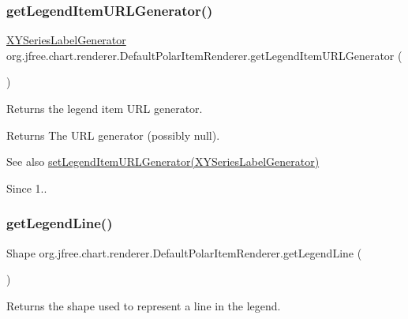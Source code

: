 \subsubsection{\texorpdfstring{get\+Legend\+Item\+U\+R\+L\+Generator()}{getLegendItemURLGenerator()}}
{\footnotesize\ttfamily \mbox{\hyperlink{interfaceorg_1_1jfree_1_1chart_1_1labels_1_1_x_y_series_label_generator}{X\+Y\+Series\+Label\+Generator}} org.\+jfree.\+chart.\+renderer.\+Default\+Polar\+Item\+Renderer.\+get\+Legend\+Item\+U\+R\+L\+Generator (\begin{DoxyParamCaption}{ }\end{DoxyParamCaption})}

Returns the legend item U\+RL generator.

\begin{DoxyReturn}{Returns}
The U\+RL generator (possibly {\ttfamily null}).
\end{DoxyReturn}
\begin{DoxySeeAlso}{See also}
\mbox{\hyperlink{classorg_1_1jfree_1_1chart_1_1renderer_1_1_default_polar_item_renderer_a38cde3541e3a1b237ffad39b0464e335}{set\+Legend\+Item\+U\+R\+L\+Generator(\+X\+Y\+Series\+Label\+Generator)}} 
\end{DoxySeeAlso}
\begin{DoxySince}{Since}
1.. 
\end{DoxySince}
\mbox{\label{classorg_1_1jfree_1_1chart_1_1renderer_1_1_default_polar_item_renderer_a5b323bb3c4df0c784bbffa591b3d8d99}} 
\subsubsection{\texorpdfstring{get\+Legend\+Line()}{getLegendLine()}}
{\footnotesize\ttfamily Shape org.\+jfree.\+chart.\+renderer.\+Default\+Polar\+Item\+Renderer.\+get\+Legend\+Line (\begin{DoxyParamCaption}{ }\end{DoxyParamCaption})}

Returns the shape used to represent a line in the legend.


